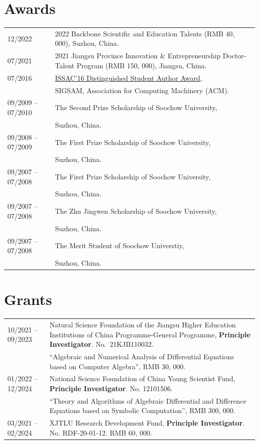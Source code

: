 \documentclass[a4paper,12pt]{article}
\begin{document}
\section*{\Large{Awards}}
\begin{tabular}{@{}p{1.4in}p{4in}}
12/2022 &  2022 Backbone Scientific and Education Talents (RMB 40, 000), Suzhou, China.  \\
07/2021         & 2021 Jiangsu Province Innovation \& Entrepreneurship Doctor-Talent Program (RMB 150, 000), 
                       Jiangsu, China. \\
07/2016               & \href{https://www.sigsam.org/Awards/ISSACAwards.html}{ISSAC'16 Distinguished Student Author Award}, \\
                      & SIGSAM, Association for Computing Machinery (ACM). \\
09/2009 -- 07/2010    & The Second Prize Scholarship of Soochow University, \\ 
                      & Suzhou, China.\\
09/2008 -- 07/2009    & The First Prize Scholarship of Soochow University, \\ 
                      & Suzhou, China.\\
09/2007 -- 07/2008    & The First Prize Scholarship of Soochow University, \\ 
                      & Suzhou, China.\\
09/2007 -- 07/2008    & The Zhu Jingwen Scholarship of Soochow University, \\ 
                      & Suzhou, China.\\
09/2007 -- 07/2008    & The Merit Student of Soochow Universtiy, \\ 
                      & Suzhou, China.\\
\end{tabular}

\section*{\Large{Grants}}
\begin{tabular}{@{}p{1.4in}p{4in}}
10/2021 -- 09/2023 & Natural Science Foundation of the Jiangsu Higher Education Institutions of China Programme-General Programme, 
                                       \textbf{Principle Investigator}. No.\ 21KJB110032. \\
                                   & ``Algebraic and Numerical Analysis of Differential Equations based on Computer Algebra'', RMB 30, 000. \\     
01/2022 -- 12/2024 & National Science Foundation of China Young Scientist Fund, \textbf{Principle Investigator}. No. 12101506. \\
                                 & ``Theory and Algorithms of Algebraic Differential and Difference Equations based on Symbolic Computation'',
                                 RMB 300, 000. \\
03/2021 -- 02/2024    & XJTLU Research Development Fund, \textbf{Principle Investigator}. No. RDF-20-01-12. RMB 60, 000.

\end{tabular}
\end{document}
